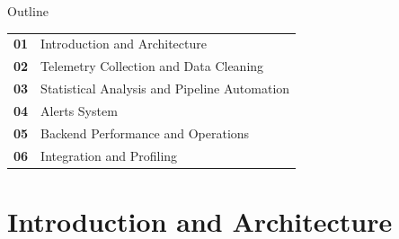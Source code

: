 \documentclass[aspectratio=169,10pt]{beamer}
\begin{document}
\begin{frame}{Outline}
    \vspace{0.65em}
    \begin{tabularx}{0.94\linewidth}{@{}p{0.9cm}X@{}}
        {\large\color{Violet}\textbf{01}} & {\large\color{Ivory}Introduction and Architecture}\\[0.9em]
        {\large\color{Violet}\textbf{02}} & {\large\color{Ivory}Telemetry Collection and Data Cleaning}\\[0.9em]
        {\large\color{Violet}\textbf{03}} & {\large\color{Ivory}Statistical Analysis and Pipeline Automation}\\[0.9em]
        {\large\color{Violet}\textbf{04}} & {\large\color{Ivory}Alerts System}\\[0.9em]
        {\large\color{Violet}\textbf{05}} & {\large\color{Ivory}Backend Performance and Operations}\\[0.9em]
        {\large\color{Violet}\textbf{06}} & {\large\color{Ivory}Integration and Profiling}\\
    \end{tabularx}
\end{frame}

\section{Introduction and Architecture}
\end{document}
